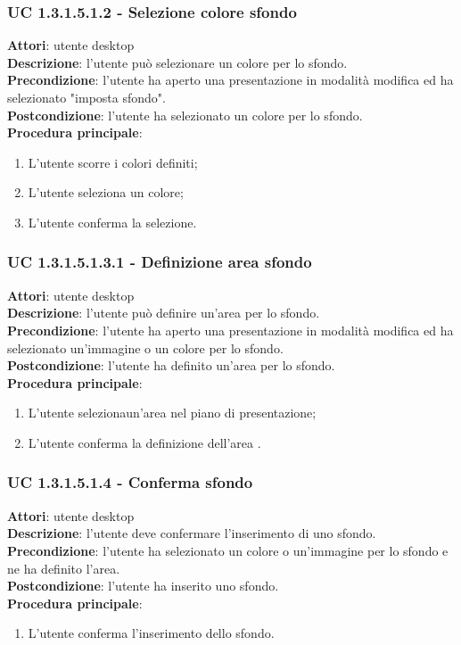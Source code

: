\subsubsection{UC 1.3.1.5.1.2 - Selezione colore sfondo}{
	\label{uc1.3.1.5.1.2}
	\textbf{Attori}: utente desktop \\
	\textbf{Descrizione}: l'utente può selezionare un colore per lo sfondo. \\
	\textbf{Precondizione}: l'utente ha aperto una presentazione in modalità modifica ed ha selezionato "imposta sfondo".	\\
	\textbf{Postcondizione}: l'utente ha selezionato un colore per lo sfondo.	\\
	\textbf{Procedura principale}:
	\begin{enumerate}
		\item L'utente scorre i colori definiti;
		\item L'utente seleziona un colore;
		\item L'utente conferma la selezione.
	\end{enumerate}
}
\subsubsection{UC 1.3.1.5.1.3.1 - Definizione area sfondo}{
	\label{uc1.3.1.5.1.3.1}
	\textbf{Attori}: utente desktop \\
	\textbf{Descrizione}: l'utente può definire un'area per lo sfondo. \\
	\textbf{Precondizione}: l'utente ha aperto una presentazione in modalità modifica ed ha selezionato un'immagine o un colore per lo sfondo.	\\
	\textbf{Postcondizione}: l'utente ha definito un'area per lo sfondo.	\\
	\textbf{Procedura principale}:
	\begin{enumerate}
		\item L'utente selezionaun'area nel piano di presentazione;
		\item L'utente conferma la definizione dell'area .
	\end{enumerate}
}

\subsubsection{UC 1.3.1.5.1.4 - Conferma sfondo}{
	\label{uc1.3.1.5.1.4}
	\textbf{Attori}: utente desktop \\
	\textbf{Descrizione}: l'utente deve confermare l'inserimento di uno sfondo. \\
	\textbf{Precondizione}: l'utente ha selezionato un colore o un'immagine per lo sfondo e ne ha definito l'area.	\\
	\textbf{Postcondizione}: l'utente ha inserito uno sfondo.	\\
	\textbf{Procedura principale}:
	\begin{enumerate}
		\item L'utente conferma l'inserimento dello sfondo.
	\end{enumerate}
}

